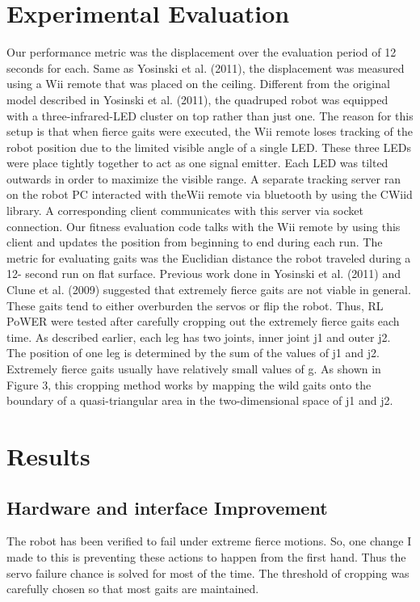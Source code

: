 \section{Experimental Evaluation}
Our performance metric was the displacement over the evaluation period of 12 seconds
for each. Same as Yosinski et al. (2011), the displacement was measured using a
Wii remote that was placed on the ceiling. Different from the original model described
in Yosinski et al. (2011), the quadruped robot was equipped with a three-infrared-LED
cluster on top rather than just one. The reason for this setup is that when fierce gaits
were executed, the Wii remote loses tracking of the robot position due to the limited
visible angle of a single LED. These three LEDs were place tightly together to act
as one signal emitter. Each LED was tilted outwards in order to maximize the visible
range. A separate tracking server ran on the robot PC interacted with theWii remote via
bluetooth by using the CWiid library. A corresponding client communicates with this
server via socket connection. Our fitness evaluation code talks with the Wii remote by
using this client and updates the position from beginning to end during each run. The
metric for evaluating gaits was the Euclidian distance the robot traveled during a 12-
second run on flat surface. Previous work done in Yosinski et al. (2011) and Clune et al.
(2009) suggested that extremely fierce gaits are not viable in general. These gaits tend
to either overburden the servos or flip the robot. Thus, RL PoWER were tested after
carefully cropping out the extremely fierce gaits each time. As described earlier, each
leg has two joints, inner joint j1 and outer j2. The position of one leg is determined by
the sum of the values of j1 and j2. Extremely fierce gaits usually have relatively small
values of g. As shown in Figure 3, this cropping method works by mapping the wild
gaits onto the boundary of a quasi-triangular area in the two-dimensional space of j1
and j2.

\section{Results}

\subsection{Hardware and interface Improvement}
The robot has been verified to fail under extreme fierce motions. So, one change I made to this is preventing these actions to happen from the first hand. Thus the servo failure chance is solved for most of the time. The threshold of cropping was carefully chosen so that most gaits are maintained. 


